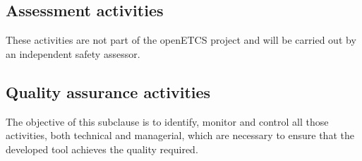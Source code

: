 \documentclass{template/openetcs_report}
\begin{document}
\subsection{Assessment activities}
These activities are not part of the openETCS project and will be carried out by an independent safety assessor.


\subsection{Quality assurance activities}
\begin{flushleft}
The objective of this subclause is to identify, monitor and control all those activities, both technical and managerial, which are necessary to ensure that the developed tool achieves the quality required. 
\end{flushleft}
\end{document}

